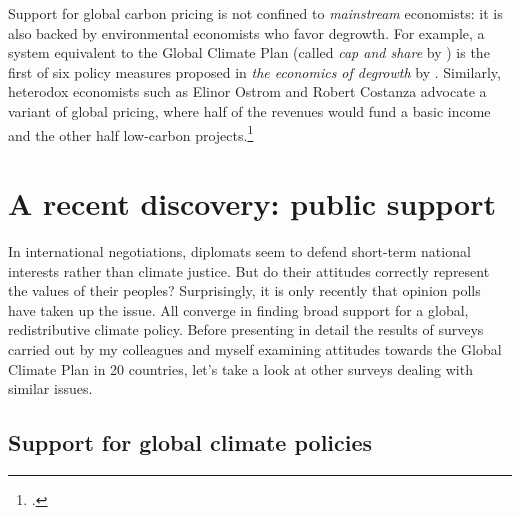 \documentclass[a5paper,english,openany]{memoir}
\begin{document}
Support for global carbon pricing is not confined to \textit{mainstream} economists: it is also backed by environmental economists who favor degrowth. For example, a system equivalent to the Global Climate Plan (called \textit{cap and share} by \citealp{douthwaite_degrowth_2012}) is the first of six policy measures proposed in \textit{the economics of degrowth} by \cite{kallis_economics_2012}. Similarly, heterodox economists such as Elinor Ostrom and Robert Costanza advocate a variant of global pricing, where half of the revenues would fund a basic income and the other half low-carbon projects.\footnote{\citet{barnes_creating_2008}.}

\section{A recent discovery: public support} \label{sec:support}

In international negotiations, diplomats seem to defend short-term national interests rather than climate justice. 
But do their attitudes correctly represent the values of their peoples? 
Surprisingly, it is only recently that opinion polls have taken up the issue. All converge in finding broad support for a global, redistributive climate policy. Before presenting in detail the results of surveys carried out by my colleagues and myself examining attitudes towards the Global Climate Plan in 20 countries, %
let's take a look at other surveys dealing with similar issues. 

\subsection{Support for global climate policies}
\end{document}
